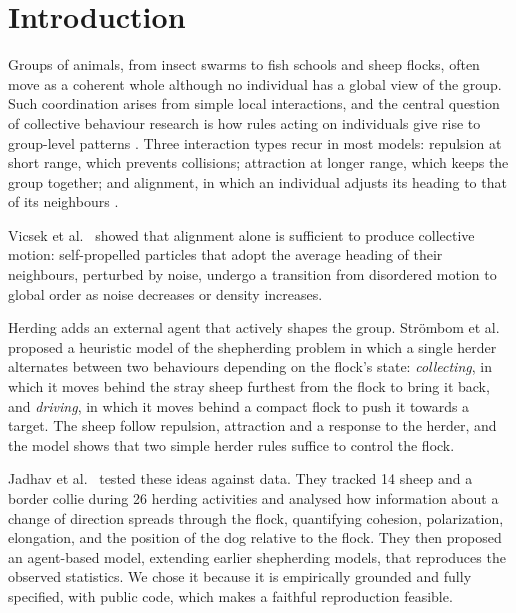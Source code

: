 \documentclass[9pt,twoside]{pnas-new}
\begin{document}

\maketitle
\thispagestyle{firststyle}

\Firstpage

\section{Introduction}

Groups of animals, from insect swarms to fish schools and sheep flocks, often move as a coherent whole although no individual has a global view of the group. Such coordination arises from simple local interactions, and the central question of collective behaviour research is how rules acting on individuals give rise to group-level patterns \cite{sumpter2006}. Three interaction types recur in most models: repulsion at short range, which prevents collisions; attraction at longer range, which keeps the group together; and alignment, in which an individual adjusts its heading to that of its neighbours \cite{reynolds1987,couzin2002}.

Vicsek et al.\ \cite{vicsek1995} showed that alignment alone is sufficient to produce collective motion: self-propelled particles that adopt the average heading of their neighbours, perturbed by noise, undergo a transition from disordered motion to global order as noise decreases or density increases.

Herding adds an external agent that actively shapes the group. Str\"{o}mbom et al.\ \cite{strombom2014} proposed a heuristic model of the shepherding problem in which a single herder alternates between two behaviours depending on the flock's state: \emph{collecting}, in which it moves behind the stray sheep furthest from the flock to bring it back, and \emph{driving}, in which it moves behind a compact flock to push it towards a target. The sheep follow repulsion, attraction and a response to the herder, and the model shows that two simple herder rules suffice to control the flock.

Jadhav et al.\ \cite{jadhav2024} tested these ideas against data. They tracked 14 sheep and a border collie during 26 herding activities and analysed how information about a change of direction spreads through the flock, quantifying cohesion, polarization, elongation, and the position of the dog relative to the flock. They then proposed an agent-based model, extending earlier shepherding models, that reproduces the observed statistics. We chose it because it is empirically grounded and fully specified, with public code, which makes a faithful reproduction feasible.
\end{document}
